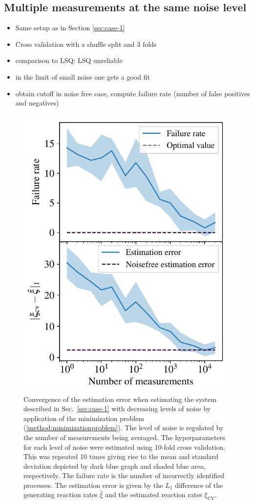 \documentclass[oneside, abstracton, titlepage]{scrartcl}
\begin{document}
	
	
	\subsection{Multiple measurements at the same noise level}\label{sec:case-2}
	
	\begin{itemize}
		\item Same setup as in Section \ref{sec:case-1}
		\item Cross validation with a shuffle split and 3 folds
		\item comparison to LSQ: LSQ unreliable
		\item in the limit of small noise one gets a good fit
		\item obtain cutoff in noise free case, compute failure rate (number of false positives and negatives)
	\end{itemize}

	\begin{figure}
		\centering
		\includegraphics[width=.5\columnwidth]{./figures_tex/case2}
		\caption{Convergence of the estimation error when estimating the system described in Sec.~\ref{sec:case-1} with decreasing levels of noise by application of the minimization problem (\ref{method:minimizationproblem}). The level of noise is regulated by the number of measurements being averaged. The hyperparameters for each level of noise were estimated using 10-fold cross validation. This was repeated 10 times giving rise to the mean and standard deviation depicted by dark blue graph and shaded blue area, respectively. The failure rate is the number of incorrectly identified processes. The estimation error is given by the $L_1$ difference of the generating reaction rates $\hat{\xi}$ and the estimated reaction rates $\xi_\mathrm{CV}$.}
		\label{fig:case2-convergence}
	\end{figure}
\end{document}
